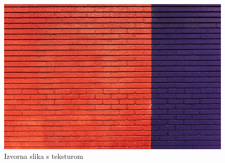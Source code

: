 \documentclass[times, utf8, seminar]{fer}
\begin{document}
\begin{center}

\begin{figure}[ht]
	\caption{Izvorna slika s teksturom}
	\label{pattern_original}
	\centerline{
	\includegraphics[scale=0.4]{../benchmark_results/pattern/pattern_original.jpg}	
	}
\end{figure}
\end{center}
\end{document}
